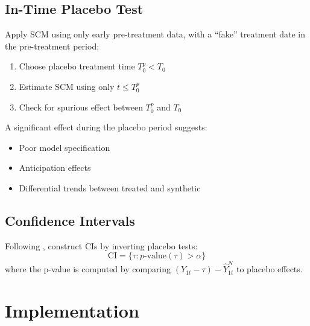\subsection{In-Time Placebo Test}

\begin{definition}
\label{def:placebo_time}
Apply SCM using only early pre-treatment data, with a ``fake'' treatment date in the pre-treatment period:
\begin{enumerate}
    \item Choose placebo treatment time $T_0^p < T_0$
    \item Estimate SCM using only $t \leq T_0^p$
    \item Check for spurious effect between $T_0^p$ and $T_0$
\end{enumerate}
\end{definition}

A significant effect during the placebo period suggests:
\begin{itemize}
    \item Poor model specification
    \item Anticipation effects
    \item Differential trends between treated and synthetic
\end{itemize}

\subsection{Confidence Intervals}

\begin{definition}
\label{def:conformal_ci}
Following \citet{chernozhukov2021exact}, construct CIs by inverting placebo tests:
\begin{equation}
    \text{CI} = \{\tau : p\text{-value}(\tau) > \alpha\}
\end{equation}
where the p-value is computed by comparing $(Y_{1t} - \tau) - \hat{Y}_{1t}^N$ to placebo effects.
\end{definition}

\section{Implementation}
\label{sec:scm_implementation}

